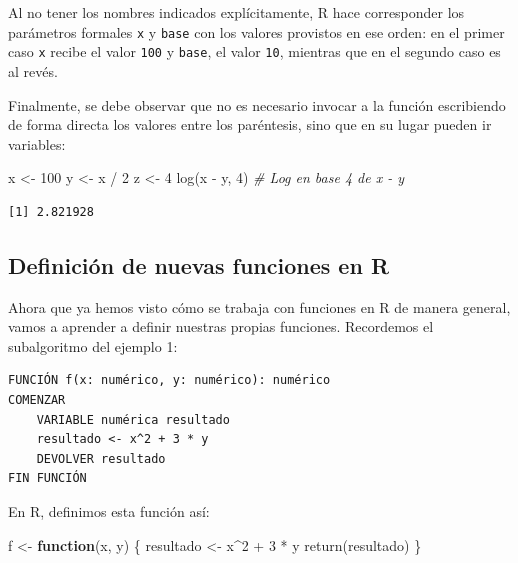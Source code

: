 \documentclass[
]{book}
\newenvironment{Shaded}{\begin{snugshade}}{\end{snugshade}}
\newcommand{\CommentTok}[1]{\textcolor[rgb]{0.56,0.35,0.01}{\textit{#1}}}
\newcommand{\ControlFlowTok}[1]{\textcolor[rgb]{0.13,0.29,0.53}{\textbf{#1}}}
\newcommand{\DecValTok}[1]{\textcolor[rgb]{0.00,0.00,0.81}{#1}}
\newcommand{\FunctionTok}[1]{\textcolor[rgb]{0.00,0.00,0.00}{#1}}
\newcommand{\NormalTok}[1]{#1}
\newcommand{\OtherTok}[1]{\textcolor[rgb]{0.56,0.35,0.01}{#1}}
\newcommand{\SpecialCharTok}[1]{\textcolor[rgb]{0.00,0.00,0.00}{#1}}
\begin{document}
Al no tener los nombres indicados explícitamente, R hace corresponder los parámetros formales \texttt{x} y \texttt{base} con los valores provistos en ese orden: en el primer caso \texttt{x} recibe el valor \texttt{100} y \texttt{base}, el valor \texttt{10}, mientras que en el segundo caso es al revés.

Finalmente, se debe observar que no es necesario invocar a la función escribiendo de forma directa los valores entre los paréntesis, sino que en su lugar pueden ir variables:

\begin{Shaded}
\begin{Highlighting}[]
\NormalTok{x }\OtherTok{\textless{}{-}} \DecValTok{100}
\NormalTok{y }\OtherTok{\textless{}{-}}\NormalTok{ x }\SpecialCharTok{/} \DecValTok{2}
\NormalTok{z }\OtherTok{\textless{}{-}} \DecValTok{4}
\FunctionTok{log}\NormalTok{(x }\SpecialCharTok{{-}}\NormalTok{ y, }\DecValTok{4}\NormalTok{)       }\CommentTok{\# Log en base 4 de x {-} y}
\end{Highlighting}
\end{Shaded}

\begin{verbatim}
[1] 2.821928
\end{verbatim}

\hypertarget{definiciuxf3n-de-nuevas-funciones-en-r}{%
\subsection{Definición de nuevas funciones en R}\label{definiciuxf3n-de-nuevas-funciones-en-r}}

Ahora que ya hemos visto cómo se trabaja con funciones en R de manera general, vamos a aprender a definir nuestras propias funciones. Recordemos el subalgoritmo del ejemplo 1:

\begin{verbatim}
FUNCIÓN f(x: numérico, y: numérico): numérico
COMENZAR
    VARIABLE numérica resultado
    resultado <- x^2 + 3 * y
    DEVOLVER resultado
FIN FUNCIÓN
\end{verbatim}

En R, definimos esta función así:

\begin{Shaded}
\begin{Highlighting}[]
\NormalTok{f }\OtherTok{\textless{}{-}} \ControlFlowTok{function}\NormalTok{(x, y) \{}
\NormalTok{    resultado }\OtherTok{\textless{}{-}}\NormalTok{ x}\SpecialCharTok{\^{}}\DecValTok{2} \SpecialCharTok{+} \DecValTok{3} \SpecialCharTok{*}\NormalTok{ y}
    \FunctionTok{return}\NormalTok{(resultado)}
\NormalTok{\}}
\end{Highlighting}
\end{Shaded}
\end{document}

